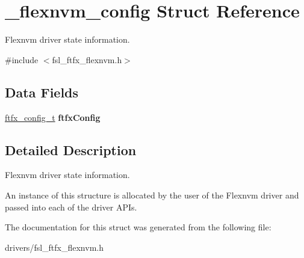 \hypertarget{struct__flexnvm__config}{}\section{\+\_\+flexnvm\+\_\+config Struct Reference}
\label{struct__flexnvm__config}


Flexnvm driver state information.  




{\ttfamily \#include $<$fsl\+\_\+ftfx\+\_\+flexnvm.\+h$>$}

\subsection*{Data Fields}
\begin{DoxyCompactItemize}
\item 
\mbox{\hyperlink{group__ftfx__controller_gab0196063c05bffb4cd2f249699a3378c}{ftfx\+\_\+config\+\_\+t}} {\bfseries ftfx\+Config}
\end{DoxyCompactItemize}


\subsection{Detailed Description}
Flexnvm driver state information. 

An instance of this structure is allocated by the user of the Flexnvm driver and passed into each of the driver A\+P\+Is. 

The documentation for this struct was generated from the following file\+:\begin{DoxyCompactItemize}
\item 
drivers/fsl\+\_\+ftfx\+\_\+flexnvm.\+h\end{DoxyCompactItemize}
